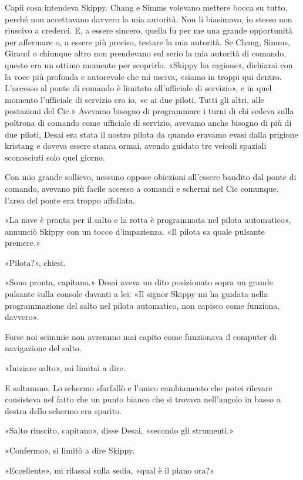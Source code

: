 Capii cosa intendeva Skippy. Chang e Simms volevano mettere bocca su
tutto, perché non accettavano davvero la mia autorità. Non li biasimavo,
io stesso non riuscivo a crederci. E, a essere sincero, quella fu per me
una grande opportunità per affermare o, a essere più preciso, testare la
mia autorità. Se Chang, Simms, Giraud o chiunque altro non prendevano
sul serio la mia autorità di comando, questo era un ottimo momento per
scoprirlo. «Skippy ha ragione», dichiarai con la voce più profonda e
autorevole che mi usciva, «siamo in troppi qui dentro. L'accesso al
ponte di comando è limitato all'ufficiale di servizio», e in quel
momento l'ufficiale di servizio ero io, «e ai due piloti. Tutti gli
altri, alle postazioni del Cic.» Avevamo bisogno di programmare i turni
di chi sedeva sulla poltrona di comando come ufficiale di servizio,
avevamo anche bisogno di più di due piloti, Desai era stata il nostro
pilota da quando eravamo evasi dalla prigione kristang e doveva essere
stanca ormai, avendo guidato tre veicoli spaziali sconosciuti solo quel
giorno.

Con mio grande sollievo, nessuno oppose obiezioni all'essere bandito dal
ponte di comando, avevano più facile accesso a comandi e schermi nel Cic
comunque, l'area del ponte era troppo affollata.

«La nave è pronta per il salto e la rotta è programmata nel pilota
automatico», annunciò Skippy con un tocco d'impazienza. «Il pilota sa
quale pulsante premere.»

«Pilota?», chiesi.

«Sono pronta, capitano.» Desai aveva un dito posizionato sopra un grande
pulsante sulla console davanti a lei: «Il signor Skippy mi ha guidata
nella programmazione del salto nel pilota automatico, non capisco come
funziona, davvero».

Forse noi scimmie non avremmo mai capito come funzionava il computer di
navigazione del salto.

«Iniziare salto», mi limitai a dire.

E saltammo. Lo schermo sfarfallò e l'unico cambiamento che potei
rilevare consisteva nel fatto che un punto bianco che si trovava
nell'angolo in basso a destra dello schermo era sparito.

«Salto riuscito, capitano», disse Desai, «secondo gli strumenti.»

«Confermo», si limitò a dire Skippy.

«Eccellente», mi rilassai sulla sedia, «qual è il piano ora?»

